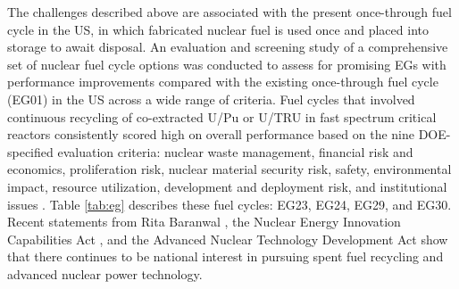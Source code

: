 The challenges described above are associated with 
the present once-through fuel cycle in the \gls{US}, 
in which fabricated nuclear fuel is used once and placed into 
storage to await disposal. 
An evaluation and screening study of a comprehensive set of nuclear 
fuel cycle options \cite{wigeland_nuclear_2014} was conducted to assess 
for promising \glspl{EG} with performance improvements compared with 
the existing once-through 
fuel cycle (EG01) in the \gls{US} across a wide range of criteria. 
Fuel cycles that involved continuous recycling
of co-extracted U/Pu or U/TRU in fast spectrum critical reactors
consistently scored high on overall performance based on the nine 
DOE-specified evaluation criteria: nuclear waste management, 
financial risk and economics, 
proliferation risk, nuclear material security risk, safety, 
environmental impact, resource utilization, development and deployment 
risk, and institutional issues \cite{wigeland_nuclear_2014}. 
Table \ref{tab:eg} describes these fuel cycles:
EG23, EG24, EG29, and EG30. 
Recent statements from Rita Baranwal \cite{noauthor_new_2019}, the Nuclear 
Energy Innovation Capabilities Act \cite{crapo_s97_2018}, and the 
Advanced Nuclear Technology Development Act \cite{latta_hr590_2017} 
show that there continues to be national interest in pursuing spent 
fuel recycling and advanced nuclear power technology. 

